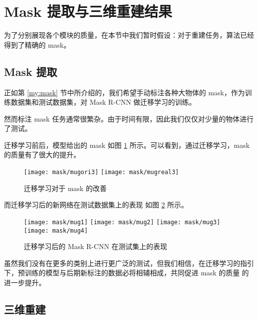 

\section{Mask 提取与三维重建结果}
为了分别展现各个模块的质量，在本节中我们暂时假设：对于重建任务，算法已经得到了精确的 mask。
\subsection{Mask 提取\label{section:mask}}
正如第 \ref{my:mask} 节中所介绍的，我们希望手动标注各种大物体的 mask，作为训练数据集和测试数据集，对 Mask R-CNN 做迁移学习的训练。

然而标注 mask 任务通常很繁杂。由于时间有限，因此我们仅仅对少量的物体进行了测试。

迁移学习前后，模型给出的 mask 如图 \ref{fig:transferchange} 所示。可以看到，通过迁移学习，mask 的质量有了很大的提升。
\begin{figure}[h]
	\centering%
	{\texttt{[image: mask/mugori3]}}%
	\hspace{2em}%
	{\texttt{[image: mask/mugreal3]}}
	\caption{迁移学习对于 mask 的改善\label{fig:transferchange}}
\end{figure}

而迁移学习后的新网络在测试数据集上的表现 %
如图 \ref{fig:transfertest} 所示。
\begin{figure}[h]
	\centering%
	{\texttt{[image: mask/mug1]}}
	{\texttt{[image: mask/mug2]}}
	{\texttt{[image: mask/mug3]}}
	{\texttt{[image: mask/mug4]}}
	\caption{迁移学习后的 Mask R-CNN \cite{maskrcnn} 在测试集上的表现\label{fig:transfertest}}
\end{figure}

虽然我们没有在更多的类别上进行更广泛的测试，但我们相信，在迁移学习的指引下，预训练的模型与后期新标注的数据必将相辅相成，共同促进 mask 的质量%
的进一步提升。


\subsection{三维重建 \label{section:recon}}


